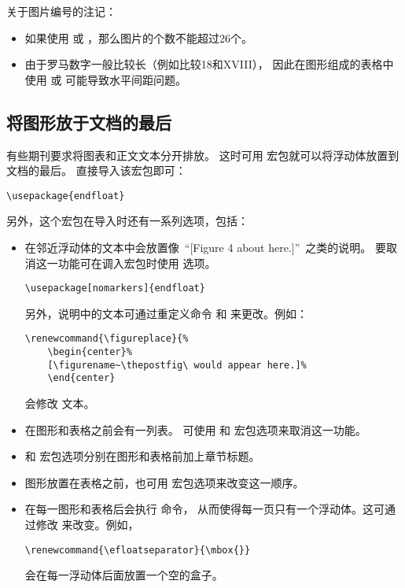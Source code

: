 关于图片编号的注记：
\begin{itemize}
	\item 如果使用  或 ，那么图片的个数不能超过26个。
	\item 由于罗马数字一般比较长（例如比较18和XVIII），
	因此在图形组成的表格中使用  或  可能导致水平间距问题。
\end{itemize}

\subsection{将图形放于文档的最后}\label{ssec:endfloat}






有些期刊要求将图表和正文文本分开排放。
这时可用  宏包就可以将浮动体放置到文档的最后。
直接导入该宏包即可：
\begin{lstlisting}
\usepackage{endfloat}
\end{lstlisting}
另外，这个宏包在导入时还有一系列选项，包括：
\begin{itemize}
	\item 在邻近浮动体的文本中会放置像~``[Figure 4 about here.]''~之类的说明。
	要取消这一功能可在调入宏包时使用  选项。
\begin{lstlisting}
\usepackage[nomarkers]{endfloat}
\end{lstlisting}
	另外，说明中的文本可通过重定义命令  和  来更改。例如：
\begin{lstlisting}
\renewcommand{\figureplace}{% 
	\begin{center}% 
	[\figurename~\thepostfig\ would appear here.]% 
	\end{center}
\end{lstlisting}
	会修改  文本。
	
	\item 在图形和表格之前会有一列表。
	可使用  和  宏包选项来取消这一功能。
	
	\item {} 和  宏包选项分别在图形和表格前加上章节标题。
	
	\item 图形放置在表格之前，也可用  宏包选项来改变这一顺序。
	
	\item 在每一图形和表格后会执行  命令，
	从而使得每一页只有一个浮动体。这可通过修改  来改变。例如，
\begin{lstlisting}
\renewcommand{\efloatseparator}{\mbox{}}
\end{lstlisting}
	会在每一浮动体后面放置一个空的盒子。
\end{itemize}

